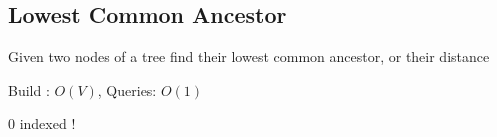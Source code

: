 \subsection{Lowest Common Ancestor}

Given two nodes of a tree find their lowest common ancestor, or their distance

Build : $O(V)$, Queries: $O(1)$

{\color{red} 0 indexed !}
